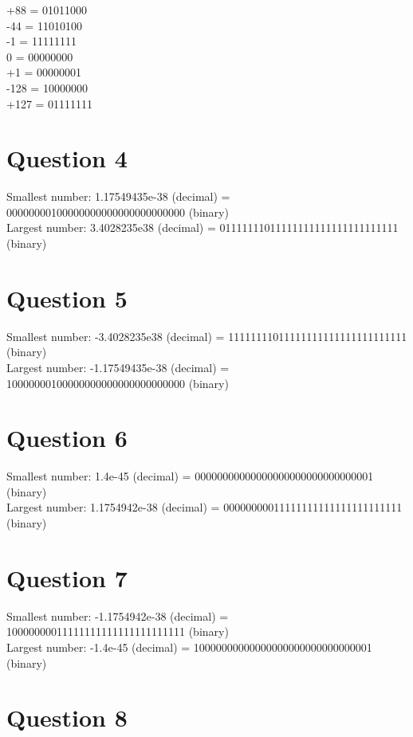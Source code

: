 \documentclass{article}
\begin{document}
+88 = 01011000 \\
-44 = 11010100 \\
-1 = 11111111 \\
0 = 00000000 \\
+1 = 00000001 \\
-128 = 10000000 \\
+127 = 01111111 \\


\section{Question 4}

Smallest number: 1.17549435e-38 (decimal) = 00000000100000000000000000000000 (binary) \\
Largest number: 3.4028235e38 (decimal) = 01111111011111111111111111111111 (binary) \\


\newpage

\section{Question 5}

Smallest number: -3.4028235e38 (decimal) = 11111111011111111111111111111111 (binary) \\
Largest number: -1.17549435e-38 (decimal) = 10000000100000000000000000000000 (binary) \\


\section{Question 6}

Smallest number: 1.4e-45 (decimal) = 00000000000000000000000000000001 (binary) \\
Largest number: 1.1754942e-38 (decimal) = 00000000011111111111111111111111 (binary) \\


\section{Question 7}

Smallest number: -1.1754942e-38 (decimal) = 10000000011111111111111111111111 (binary) \\
Largest number: -1.4e-45 (decimal) = 10000000000000000000000000000001 (binary) \\


\section{Question 8}
\end{document}

